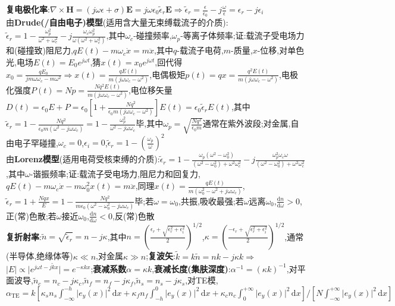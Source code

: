 \documentclass[a4paper,10pt]{article}
\providecommand{\abs}[1]{\lvert#1\rvert}
\begin{document}
\begin{multicols}{2}
    \textbf{复电极化率}:$\nabla\times\bm{H}=(j\omega\epsilon+\sigma)\bm{E}=j\omega\epsilon_0\tilde{\epsilon}_r\bm{E}\Rightarrow\tilde{\epsilon}_{r}=\frac{\epsilon}{\epsilon_0}-j\frac{\omega}{\epsilon}=\epsilon_r-j\epsilon_i$\\
    由\textbf{Drude(/自由电子)模型}(适用含大量无束缚载流子的介质):$\tilde{\epsilon}_r=1-\frac{\omega_p^2}{\omega^2+\omega_c^2}-j\frac{\omega_c\omega_p^2}{\omega(\omega^2+\omega_c^2)}$,其中$\omega_c$-碰撞频率,$\omega_p$-等离子体频率;证:载流子受电场力和(碰撞致)阻尼力,$qE(t)-m\omega_c\dot{x}=m\ddot{x}$,其中$q$-载流子电荷,$m$-质量,$x$-位移,对单色光,电场$E(t)=E_0e^{j\omega t}$,猜$x(t)=x_0e^{j\omega t}$,回代得$x_0=\frac{qE_0}{jm\omega\omega_c-m\omega^2}\Rightarrow x(t)=\frac{qE(t)}{m(j\omega\omega_c-\omega^2)}$,电偶极矩$p(t)=qx=\frac{q^2E(t)}{m(j\omega\omega_c-\omega^2)}$,电极化强度$P(t)=Np=\frac{Nq^2E(t)}{m(j\omega\omega_c-\omega^2)}$,电位移矢量$D(t)=\epsilon_0E+P=\epsilon_0[1+\frac{Nq^2}{\epsilon_0m(j\omega\omega_c-\omega^2)}]E(t)=\epsilon_0\tilde{\epsilon}_rE(t)$,其中$\tilde{\epsilon}_r=1-\frac{Nq^2}{\epsilon_0m(\omega^2-j\omega\omega_c)}=1-\frac{\omega_p^2}{\omega^2-j\omega\omega_c}$毕,其中$\omega_p=\sqrt{\frac{Nq^2}{\epsilon_0m}}$通常在紫外波段;对金属,自由电子罕碰撞,$\omega_c=0$,$\epsilon_i=0$,$\tilde{\epsilon}_r=1-(\frac{\omega_p}{\omega})^2$\\
    由\textbf{Lorenz模型}(适用电荷受核束缚的介质):$\tilde{\epsilon}_r=1-\frac{\omega_p(\omega^2-\omega_0^2)}{(\omega^2-\omega_0^2)+\omega^2\omega_c^2}-j\frac{\omega_p^2\omega_c\omega}{(\omega^2-\omega_0^2)+\omega^2\omega_c^2}$,其中$\omega$-谐振频率;证:载流子受电场力,阻尼力和回复力,$qE(t)-m\omega_c\dot{x}-m\omega_0^2x(t)=m\ddot{x}$,同理$x(t)=\frac{qE(t)}{m(\omega_0^2-\omega^2+j\omega\omega_c)}$,$\tilde{\epsilon}_r=1+\frac{Nqx}{E}=1-\frac{Nq^2}{m\epsilon_0(\omega^2-\omega_0^2-j\omega\omega_c)}$毕;若$\omega=\omega_0$,共振,吸收最强;若$\omega$远离$\omega_0$,$\frac{\mathrm{d}n}{\mathrm{d}\omega}>0$,正(常)色散;若$\omega$接近$\omega_0$,$\frac{\mathrm{d}n}{\mathrm{d}\omega}<0$,反(常)色散\\ %
    \textbf{复折射率}:$\tilde{n}=\sqrt{\tilde{\epsilon}_r}=n-j\kappa$,其中$n=(\frac{\epsilon_r+\sqrt{\epsilon_r^2+\epsilon_i^2}}{2})^{1/2}$,$\kappa=(\frac{-\epsilon_r+\sqrt{\epsilon_r^2+\epsilon_i^2}}{2})^{1/2}$,通常(半导体,绝缘体等)$\kappa\ll n$,对金属$\kappa\gg n$;\textbf{复波矢}:$\tilde{k}=k\tilde{n}=nk-j\kappa k\Rightarrow$$\abs{E}\propto\abs{e^{j\omega t-j\tilde{k}x}}=e^{-\kappa kx}$;\textbf{衰减系数}$\alpha=\kappa k$,\textbf{衰减长度(集肤深度)}:$\alpha^{-1}=(\kappa k)^{-1}$,对平面波导,$\tilde{n}_c=n_c-j\kappa_c$,$\tilde{n}_f=n_f-j\kappa_f$,$\tilde{n}_s=n_s-j\kappa_s$,对TE模,$\alpha_{\text{TE}}=k[\kappa_sn_s\int_{-\infty}^{-h}\abs{e_y(x)}^2\,\mathrm{d}x+\kappa_fn_f\int_{-h}^0\abs{e_y(x)}^2\,\mathrm{d}x+\kappa_cn_c\int_0^{+\infty}\abs{e_y(x)}^2\,\mathrm{d}x]/[N\int_{-\infty}^{+\infty}\abs{e_y(x)}^2\,\mathrm{d}x]$\\
$$
\end{multicols}
\end{document}
